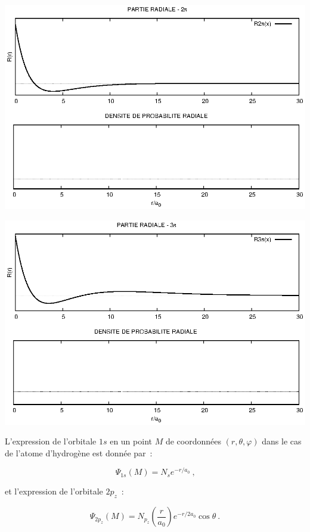 \begin{center}
\includegraphics[angle=90,width=\textwidth]{figure/rad2s.eps}
\end{center}
\clearpage

\begin{center}
\includegraphics[angle=90,width=\textwidth]{figure/rad3s.eps}
\end{center}
\clearpage

L'expression de l'orbitale $1s$ en un point $ M$ de coordonn\'ees  
$(r,\theta,\varphi)$ dans le cas de l'atome d'hydrog\`ene est donn\'ee par~:

$$
\Psi_{1s}(M)=N_s e^{-r/a_0} \ \text{,}
$$

et l'expression de l'orbitale $2p_z$~: 

$$
\Psi_{2p_z}(M)=
N_{p_z}\left(\frac{r}{a_0}\right)e^{-r/2a_0}\cos{\theta} \ .
$$

